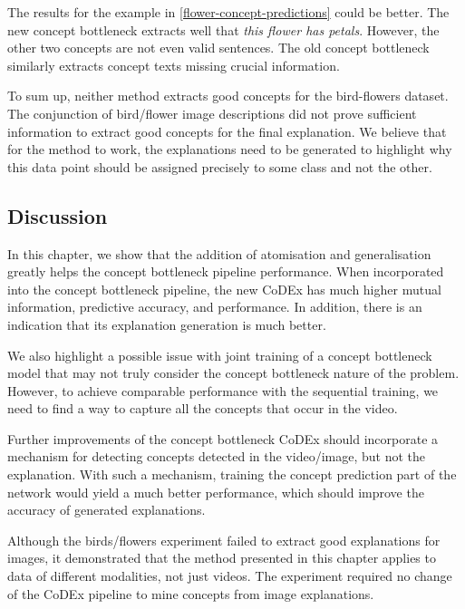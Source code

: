 The results for the example in \ref{flower-concept-predictions} could be better.
The new concept bottleneck extracts well that \emph{this flower has petals}.
However, the other two concepts are not even valid sentences.
The old concept bottleneck similarly extracts concept texts missing crucial information.


To sum up, neither method extracts good concepts for the bird-flowers dataset.
The conjunction of bird/flower image descriptions did not prove sufficient information to extract good concepts for the final explanation.
We believe that for the method to work, the explanations need to be generated to highlight why this data point should be assigned precisely to some class and not the other.


\subsection{Discussion}

In this chapter, we show that the addition of atomisation and generalisation greatly helps the concept bottleneck pipeline performance.
When incorporated into the concept bottleneck pipeline, the new CoDEx has much higher mutual information,  predictive accuracy, and performance.
In addition, there is an indication that its explanation generation is much better.

We also highlight a possible issue with joint training of a concept bottleneck model that may not truly consider the concept bottleneck nature of the problem.
However, to achieve comparable performance with the sequential training, we need to find a way to capture all the concepts that occur in the video.

Further improvements of the concept bottleneck CoDEx should incorporate a mechanism for detecting concepts detected in the video/image, but not the explanation.
With such a mechanism, training the concept prediction part of the network would yield a much better performance, which should improve the accuracy of generated explanations.

Although the birds/flowers experiment failed to extract good explanations for images, it demonstrated that the method presented in this chapter applies to data of different modalities, not just videos.
The experiment required no change of the CoDEx pipeline to mine concepts from image explanations.
